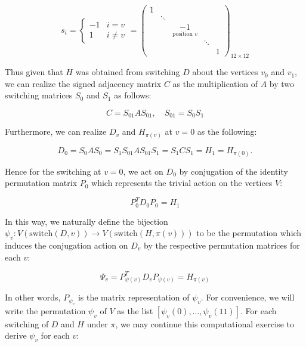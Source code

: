 \documentclass[11pt]{article}
\theoremstyle{definition}
\numberwithin{equation}{section}
\begin{document}
\begin{humanaiblock}
\[ 
s_i=\begin{cases}-1 & i=v\\ 1 & i\neq v\end{cases}
=
\begin{pmatrix}
1 &  &  &  &  \\
 & \ddots &  &  &  \\
 &  & \underset{\text{position }v}{-1} &  &  \\
 &  &  & \ddots &  \\
 &  &  &  & 1
\end{pmatrix}_{12\times12}
\]

Thus given that $H$ was obtained from switching $D$ about the vertices $v_0$ and $v_1$, we can realize the signed adjacency matrix $C$ as the multiplication of $A$ by two switching matrices $S_0$ and $S_1$ as follows: 

\[ C = S_{01}AS_{01}, \quad S_{01} = S_0S_1\] 

Furthermore, we can realize $D_v$ and $H_{\pi(v)}$ at $v=0$ as the following: 

\[ D_0 = S_0AS_0 = S_1S_{01}AS_{01}S_1 = S_1CS_1 = H_1 = H_{\pi(0)}.\] 

Hence for the switching at $v=0$, we act on $D_0$ by conjugation of the identity permutation matrix $P_0$ which represents the trivial action on the vertices $V$:

\[ P_0^TD_0P_0 = H_1\]

In this way, we naturally define the bijection $\psi_v: V(\mathrm{switch}(D,v))\to V(\mathrm{switch}(H,\pi(v)))$ to be the permutation which induces the conjugation action on $D_v$ by the respective permutation matrices for each $v$: 

\[ \Psi_v = P_{\psi(v)}^TD_vP_{\psi(v)} = H_{\pi(v)}\]

In other words, $P_{\psi_v}$ is the matrix representation of $\psi_v$. For convenience, we will write the permutation $\psi_v$ of $V$ as the list $[\psi_v(0),\dots,\psi_v(11)]$. For each switching of $D$ and $H$ under $\pi$, we may continue this computational exercise to derive $\psi_v$ for each $v$:



\end{humanaiblock}
\end{document}

